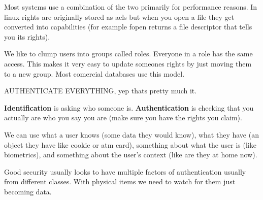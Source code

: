 \documentclass{article}
\begin{document}

Most systems use a combination of the two primarily for performance reasons. In linux rights are originally stored as acls but when you open a file they get converted into capabilities (for example fopen returns a file descriptor that tells you its rights).


We like to clump users into groups called roles. Everyone in a role has the same access. This makes it very easy to update someones rights by just moving them to a new group. Most comercial databases use this model.




AUTHENTICATE EVERYTHING, yep thats pretty much it.

\textbf{Identification} is asking who someone is. \textbf{Authentication} is checking that you actually are who you say you are (make sure you have the rights you claim).


We can use what a user knows (some data they would know), what they have (an object they have like cookie or atm card), something about what the user is (like biometrics), and something about the user's context (like are they at home now).


Good security usually looks to have multiple factors of authentication usually from different classes. With physical items we need to watch for them just becoming data. 
\end{document}
